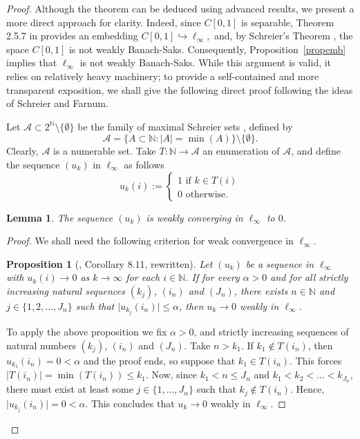 \documentclass[11pt, reqno]{amsart}
\newtheorem{lemma}[thm]{Lemma}
\newtheorem{prop}[thm]{Proposition}
\begin{document}
\begin{proof}
Although the theorem can be deduced using advanced results, we present a more direct approach for clarity. 
Indeed, since \(C[0,1]\) is separable, Theorem 2.5.7 in \cite{bookA} provides an embedding $
C[0,1] \hookrightarrow \ell_\infty,$
and, by Schreier's Theorem \cite{schreier_gegenbeispiel_1930}, the space \(C[0,1]\) is not weakly Banach-Saks. 
Consequently, Proposition~\ref{propemb} implies that \(\ell_\infty\) is not weakly Banach-Saks. 
While this argument is valid, it relies on relatively heavy machinery; 
to provide a self-contained and more transparent exposition, we shall give the following direct proof following the ideas of Schreier and Farnum.

Let $\mathcal{A} \subset 2^{\mathbb{N}}\setminus \{\emptyset\}$ be the family of maximal Schreier sets \cite{BEANLAND_GOROVOY_HODOR_HOMZA_2024}, defined by
\[
    \mathcal{A}=\{A \subset \mathbb{N}: \vert A\vert=\min(A) \}\setminus\{\emptyset\}.
\] Clearly, $\mathcal{A}$ is a numerable set. Take $T:\mathbb{N}\rightarrow\mathcal{A}$ an enumeration of $\mathcal{A}$, and define the sequence $(u_k)$ in $\ell_\infty$ as follows
$$
u_k(i):=\begin{cases}
    1 \text{ if } k\in T(i)\\
    0 \text{ otherwise.}
\end{cases}
$$
\begin{lemma} \label{jeden}
    The sequence $(u_k)$ is weakly converging in $\ell_\infty$ to $0$.
\end{lemma}
\begin{proof}
We shall need the following criterion for weak convergence in $\ell_{\infty}$.
\begin{prop}[\cite{toland_dual_2020}, Corollary 8.11, rewritten]
    Let $(u_k)$ be a sequence in $\ell_{\infty}$ with $u_k(i) \rightarrow 0$ as $k \rightarrow \infty$ for each $i \in \mathbb{N}$.
    If for every $\alpha>0$ and for all strictly increasing natural sequences $(k_j)$, $(i_n)$ and $(J_n)$, there exists $n\in\mathbb{N}$ and $j\in\{1,2,...,J_n\}$ such that $\vert u_{k_j}(i_n)\vert\leq \alpha$, then $u_k \rightarrow 0$ weakly in $\ell_{\infty}$.
\end{prop}
    To apply the above proposition we fix $\alpha>0$, and strictly increasing sequences of natural numbers $(k_j)$, $(i_n)$ and $(J_n)$. Take $n>k_1$. If $k_1\not\in T(i_n)$, then $u_{k_1}(i_n)=0<\alpha$ and the proof ends, so suppose that $k_1\in T(i_n)$. This forces $\vert T(i_n)\vert=\min(T(i_n))\leq k_1$. Now, since $k_1<n\leq J_n$ and $k_1<k_2<...<k_{J_n}$, there must exist at least some $j\in\{1,...,J_n\}$ such that $k_j\not\in T(i_n)$.
    Hence, $\vert u_{k_j}(i_n)\vert=0<\alpha$. This concludes that $u_k\rightarrow0$ weakly in $\ell_{\infty}$.
\end{proof}


\end{proof}
\end{document}
